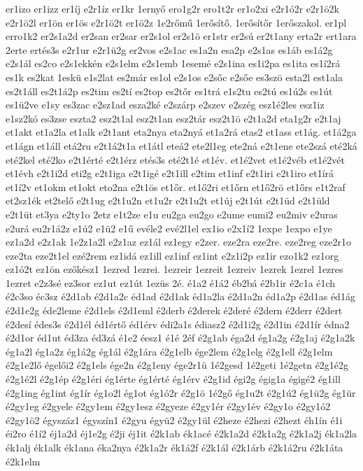 {er1izo
er1izz
er1íj
e2r1íz
er1kr
1ernyő
ero1g2r
ero1t2r
er1o2xi
e2r1ó2r
e2r1ö2k
e2r1ö2l
er1ön
er1ös
e2r1ö2t
er1ö2z
1e2rőmű
1erősítő.
1erősítőr
1erőszakol.
er1pl
erro1k2
er2s1a2d
er2san
er2sar
er2s1ol
er2s1ö
er1str
er2sú
er2t1any
erta2r
ert1ara
2erte
ertés3s
e2r1ur
e2r1ü2g
er2vos
e2s1ac
es1a2n
esa2p
e2s1as
es1áb
es1á2g
e2s1ál
es2co
e2s1ekkén
e2s1elm
e2s1emb
1esemé
e2s1ina
es1i2pa
es1ita
es1í2rá
es1k
es2kat
1eskü
e1s2lat
es2már
es1ol
e2s1os
e2sőc
e2sőe
es3szö
esta2l
est1ala
es2t1áll
es2t1á2p
es2tim
es2tí
es2top
es2tőr
es1trá
e1s2tu
es2tú
es1ú2s
es1út
es1ü2ve
e1sy
es3zac
e2sz1ad
esza2ké
e2szárp
e2szev
e2szég
esz1é2les
esz1iz
e1sz2kó
es3zse
eszta2
esz2t1al
esz2t1an
esz2tár
esz2t1ö
e2t1a2d
eta1g2r
e2t1aj
et1akt
et1a2la
et1alk
e2t1ant
eta2nya
eta2nyá
et1a2rá
etas2
et1ass
et1ág.
et1á2ga
et1ágn
et1áll
etá2ru
e2t1á2t1a
et1átl
eteá2
ete2l1eg
ete2ná
e2t1ene
ete2szá
eté2ká
eté2kel
eté2ko
e2t1érté
e2t1érz
etés3s
eté2t1é
et1év.
et1é2vet
et1é2véb
et1é2vét
et1évh
e2t1i2d
eti2g
e2t1iga
e2t1igé
e2t1ill
e2tim
et1inf
e2t1iri
e2t1iro
et1írá
et1í2v
et1okm
et1okt
eto2na
e2t1ös
et1őr.
et1ő2ri
et1őrn
et1ő2rö
et1őrs
e1t2raf
et2sz1ék
et2telő
e2t1ug
e2t1u2n
et1u2r
e2t1u2t
et1új
e2t1út
e2t1üd
e2t1üld
e2t1üt
et3ya
e2ty1o
2etz
e1t2ze
e1u
eu2ga
eu2go
e2ume
eumi2
eu2miv
e2uras
e2urá
eu2r1á2z
e1ú2
e1ü2
e1ű
evéle2
evé2l1el
ex1io
e2x1í2
1expe
1expo
e1ye
ez1a2d
e2z1ak
1e2z1a2l
e2z1az
ez1ál
ez1egy
e2zer.
eze2ra
eze2re.
eze2reg
eze2r1o
eze2ta
eze2t1el
ezé2rem
ez1idá
ez1ill
ez1inf
ez1int
e2z1i2p
ez1ir
ezo1k2
ez1org
ez1ó2t
ez1ön
ezőkész1
1ezred
1ezrei.
1ezreir
1ezreit
1ezreiv
1ezrek
1ezrel
1ezres
1ezret
e2z3sé
ez3sor
ez1ut
ez1út
1ezüs
2é.
é1a2
é1á2
éb2bá
é2b1ir
é2c1a
é1ch
é2c3so
éc3sz
é2d1ab
é2d1a2c
éd1ad
é2d1ak
éd1a2la
é2d1a2n
éd1a2p
é2d1as
éd1ág
é2d1e2g
éde2leme
é2d1els
é2d1eml
é2derb
é2derek
é2deré
é2dern
é2derr
é2dert
é2desí
édes3s
é2d1él
éd1értő
éd1érv
édi2a1s
édiasz2
é2d1i2g
é2d1in
é2d1ír
édna2
é2d1or
éd1ut
éd3za
éd3zá
é1e2
éesz1
é1é
2éf
é2g1ab
éga2d
ég1a2g
é2g1aj
é2g1a2k
ég1a2l
ég1a2z
ég1á2g
ég1ál
é2g1ára
é2g1elb
ége2lem
é2g1elg
é2g1ell
é2g1elm
é2g1e2lő
égelői2
é2g1els
ége2n
é2g1eny
ége2r1ü
1é2gesd
1é2geti
1é2getn
é2g1é2g
é2g1é2l
é2g1ép
é2g1éri
ég1érte
ég1érté
ég1érv
é2g1id
égi2g
égig1a
égigé2
ég1ill
é2g1ing
ég1int
ég1ír
ég1o2l
ég1ot
ég1ó2r
é2g1ö
1é2gő
ég1u2t
é2g1ú2
ég1ü2g
ég1ür
é2gy1eg
é2gyele
é2gy1em
é2gy1esz
é2gyeze
é2gy1ér
é2gy1év
é2gy1o
é2gy1ó2
é2gy1ö2
égyszáz1
égyszín1
é2gyu
égyü2
é2gy1ül
é2heze
é2hezi
é2hezt
éh1ín
é1i
éi2ro
é1í2
éj1a2d
éj1e2g
é2ji
éj1it
é2k1ab
ék1acé
é2k1a2d
é2k1a2g
é2k1a2j
ék1a2la
ék1alj
ék1alk
ék1ana
éka2nya
é2k1a2r
ék1á2f
é2k1ál
é2k1árb
é2k1á2ru
é2k1áta
é2k1elm
}
